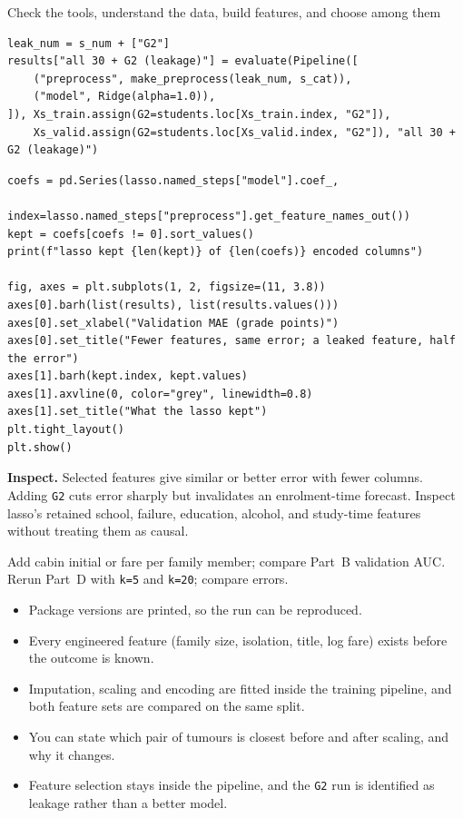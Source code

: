 \begin{labproject}{Check the tools, understand the data, build features, and choose among them}
\begin{lstlisting}[style=utppython]
leak_num = s_num + ["G2"]
results["all 30 + G2 (leakage)"] = evaluate(Pipeline([
    ("preprocess", make_preprocess(leak_num, s_cat)),
    ("model", Ridge(alpha=1.0)),
]), Xs_train.assign(G2=students.loc[Xs_train.index, "G2"]),
    Xs_valid.assign(G2=students.loc[Xs_valid.index, "G2"]), "all 30 + G2 (leakage)")
\end{lstlisting}

\begin{lstlisting}[style=utppython]
coefs = pd.Series(lasso.named_steps["model"].coef_,
                  index=lasso.named_steps["preprocess"].get_feature_names_out())
kept = coefs[coefs != 0].sort_values()
print(f"lasso kept {len(kept)} of {len(coefs)} encoded columns")

fig, axes = plt.subplots(1, 2, figsize=(11, 3.8))
axes[0].barh(list(results), list(results.values()))
axes[0].set_xlabel("Validation MAE (grade points)")
axes[0].set_title("Fewer features, same error; a leaked feature, half the error")
axes[1].barh(kept.index, kept.values)
axes[1].axvline(0, color="grey", linewidth=0.8)
axes[1].set_title("What the lasso kept")
plt.tight_layout()
plt.show()
\end{lstlisting}

\textbf{Inspect.} Selected features give similar or better error with fewer columns. Adding \texttt{G2} cuts error sharply but invalidates an enrolment-time forecast. Inspect lasso's retained school, failure, education, alcohol, and study-time features without treating them as causal.

\begin{tryit}
Add cabin initial or fare per family member; compare Part~B validation AUC. Rerun Part~D with \texttt{k=5} and \texttt{k=20}; compare errors.
\end{tryit}
\end{labproject}

\begin{verification}
\begin{itemize}
  \item Package versions are printed, so the run can be reproduced.
  \item Every engineered feature (family size, isolation, title, log fare) exists before the outcome is known.
  \item Imputation, scaling and encoding are fitted inside the training pipeline, and both feature sets are compared on the same split.
  \item You can state which pair of tumours is closest before and after scaling, and why it changes.
  \item Feature selection stays inside the pipeline, and the \texttt{G2} run is identified as leakage rather than a better model.
\end{itemize}
\end{verification}
